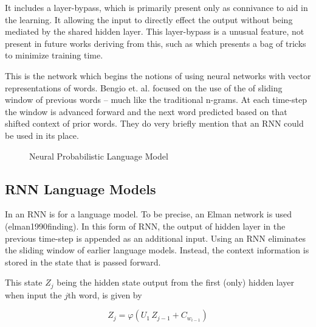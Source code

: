 \documentclass[parskip]{komatufte}
\begin{document}
It includes a layer-bypass, which is primarily present only as connivance to aid in the learning.
It allowing the input to directly effect the output without being mediated by the shared hidden layer.
This layer-bypass is a unusual feature, not present in future works deriving from this, such as  which presents a bag of tricks to minimize training time. 





This is the network which begins the notions of using neural networks with vector representations of words.
Bengio et. al. focused on the use of the of sliding window of previous words -- much like the traditional n-grams.
At each time-step the window is advanced forward and the next word predicted based on that shifted context of prior words.
They do very briefly mention that an RNN could be used in its place.

\begin{figure}
	\centering
	 
	\caption{\label{fig:neural-language-model} Neural Probabilistic Language Model}
\end{figure}


\subsection{RNN Language Models}


In  an RNN is for a language model.
To be precise, an Elman network is used \tcite(elman1990finding).
In this form of RNN, the output of hidden layer in the previous time-step is appended as an additional input.
Using an RNN eliminates the sliding window of earlier language models.
Instead, the context information is stored in the state that is passed forward.

This state $Z_{j}$ being the hidden state output from the first (only) hidden layer when input the $j$th word, 
is given by 

\begin{equation}
	Z_{j} = \varphi\left( U_1\,Z_{j-1} + C_{w_{i-1}} \right)
\end{equation}
\end{document}
